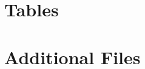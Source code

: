 \documentclass[twocolumn]{bmcart}%
\begin{document}
\begin{backmatter}

\section*{Tables}


\section*{Additional Files}



\end{backmatter}
\end{document}
